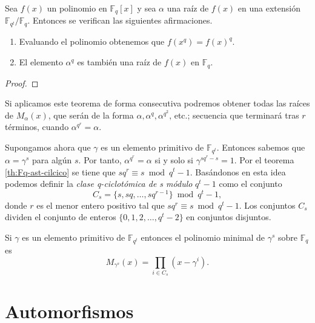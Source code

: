 \begin{theorem}
  Sea \(f(x)\) un polinomio en \(\mathbb F_q[x]\) y sea \(\alpha\) una raíz de \(f(x)\) en una extensión \(\mathbb F_{q^t}/\mathbb F_q\).
  Entonces se verifican las siguientes afirmaciones.
  \begin{enumerate}
    \item Evaluando el polinomio obtenemos que \(f(x^q) = f(x)^q\).
    \item El elemento \(\alpha^q\) es también una raíz de \(f(x)\) en \(\mathbb F_q\).
  \end{enumerate}
\end{theorem}

\begin{proof}
\end{proof}

Si aplicamos este teorema de forma consecutiva podremos obtener todas las raíces de \(M_{\alpha}(x)\), que serán de la forma \(\alpha, \alpha^q, \alpha^{q^2},\)\,etc.; secuencia que terminará tras \(r\) términos, cuando \(\alpha^{q^r} = \alpha\).

Supongamos ahora que \(\gamma\) es un elemento primitivo de \(\mathbb F_{q^t}\).
Entonces sabemos que \(\alpha = \gamma^s\) para algún \(s\).
Por tanto, \(\alpha^{q^r} = \alpha\) si y solo si \(\gamma^{sq^r - s} = 1\).
Por el teorema \ref{th:Fq-ast-cilcico} se tiene que \(sq^r \equiv s \bmod q^t - 1\).
Basándonos en esta idea podemos definir la \textit{clase q-ciclotómica de s módulo} \(q^t - 1\) como el conjunto
\[
  C_s = \{s, sq, \dots, sq^{r-1}\} \bmod q^t - 1, 
\]
donde \(r\) es el menor entero positivo tal que \(sq^r \equiv s \bmod q^t - 1\).
Los conjuntos \(C_s\) dividen el conjunto de enteros \(\{0, 1, 2, \dots, q^t - 2\}\) en conjuntos disjuntos.


\begin{theorem}
  Si \(\gamma\) es un elemento primitivo de \(\mathbb F_{q^t}\) entonces el polinomio minimal de \(\gamma^s\) sobre \(\mathbb F_q\) es
  \[
    M_{\gamma^s}(x) = \prod_{i \in C_s}(x - \gamma^i).
  \]
\end{theorem}

\section{Automorfismos}
